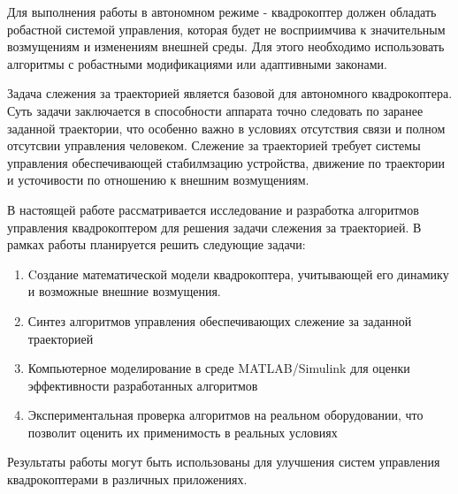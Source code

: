 Для выполнения работы в автономном режиме - квадрокоптер должен обладать 
робастной системой управления, которая будет не восприимчива к значительным 
возмущениям и изменениям внешней среды. Для этого необходимо 
использовать алгоритмы с робастными модификациями или адаптивными законами.


Задача слежения за траекторией является базовой для 
автономного квадрокоптера. Суть задачи заключается в  
способности аппарата точно следовать по заранее заданной 
траектории, что особенно важно в условиях отсутствия связи и полном отсутсвии управления человеком. 
Слежение за траекторией требует системы управления обеспечивающей стабилмзацию устройства, движение по траектории и усточивости по отношению к внешним возмущениям.


В настоящей работе рассматривается исследование и разработка 
алгоритмов управления квадрокоптером для решения задачи слежения 
за траекторией. В рамках работы планируется решить следующие задачи:

\begin{enumerate}
    \item Cоздание математической модели квадрокоптера, учитывающей его динамику и возможные 
    внешние возмущения.
    \item Синтез алгоритмов управления обеспечивающих слежение за заданной траекторией
    \item Компьютерное моделирование в среде MATLAB/Simulink 
    для оценки эффективности разработанных алгоритмов
    \item Экспериментальная проверка алгоритмов на реальном 
    оборудовании, что позволит оценить их применимость в реальных условиях
\end{enumerate}


Результаты работы могут быть использованы для улучшения систем управления 
квадрокоптерами в различных приложениях.
  




\endinput
